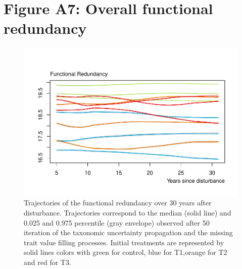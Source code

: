 \documentclass[fleqn,10pt]{ArtEcoFoG} %
\begin{document}
\section{\texorpdfstring{\textbf{Figure A7}: Overall functional
redundancy}{Figure A7: Overall functional redundancy}}\label{figure-a7-overall-functional-redundancy}

\begin{figure}

{\centering \includegraphics[width=1\linewidth]{AppendixI_files/figure-latex/RedFun-1} 

}

\caption{Trajectories of the functional redundancy over 30 years after disturbance. Trajectories correspond to the median (solid line) and 0.025 and 0.975 percentile (gray envelope) observed after 50 iteration of the taxonomic uncertainty propagation and the missing trait value filling processes. Initial treatments are represented by solid lines colors with green for control, blue for T1,orange for T2 and red for T3.}\label{fig:RedFun}
\end{figure}



\makeatletter
\filename@parse{}

\makeatother


\end{document}
